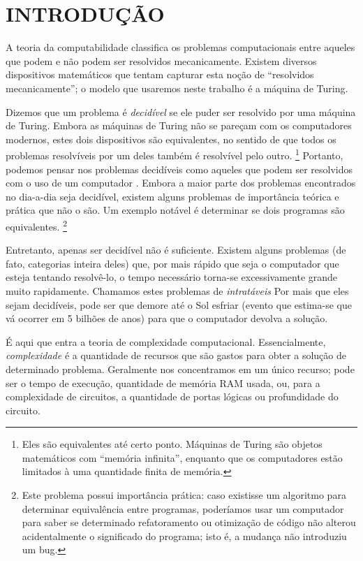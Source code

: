 \chapter{INTRODUÇÃO}

A teoria da computabilidade
classifica os problemas computacionais entre
aqueles que podem e não podem ser resolvidos mecanicamente.
Existem diversos dispositivos matemáticos
que tentam capturar esta noção de
``resolvidos mecanicamente'';
o modelo que usaremos neste trabalho é a máquina de Turing.

Dizemos que um problema é \emph{decidível}
se ele puder ser resolvido por uma máquina de Turing.
Embora as máquinas de Turing
não se pareçam com os computadores modernos,
estes dois dispositivos são equivalentes,
no sentido de que
todos os problemas resolvíveis por um deles
também é resolvível pelo outro.
\footnote{
    Eles são equivalentes até certo ponto.
    Máquinas de Turing são objetos matemáticos
    com ``memória infinita'',
    enquanto que os computadores estão limitados
    à uma quantidade finita de memória.
}
Portanto, podemos pensar nos problemas decidíveis
como aqueles que podem ser resolvidos com o uso de um computador
\cite[p. 307]{HopcroftMotwaniUllman2001}.
Embora a maior parte dos problemas
encontrados no dia-a-dia seja decidível,
existem alguns problemas de importância teórica e prática
que não o são.
Um exemplo notável é determinar se dois programas são equivalentes.
\footnote{
    Este problema possui importância prática:
    caso existisse um algoritmo para determinar equivalência entre programas,
    poderíamos usar um computador para saber se
    determinado refatoramento ou otimização de código
    não alterou acidentalmente o significado do programa;
    isto é, a mudança não introduziu um bug.
}

Entretanto,
apenas ser decidível não é suficiente.
Existem alguns problemas
(de fato, categorias inteira deles)
que, por mais rápido que seja o computador
que esteja tentando resolvê-lo,
o tempo necessário torna-se excessivamente grande
muito rapidamente.
Chamamos estes problemas de \emph{intratáveis}
\cite[p. 1]{HopcroftMotwaniUllman2001}
Por mais que eles sejam decidíveis,
pode ser que demore até o Sol esfriar
(evento que estima-se que vá ocorrer em 5 bilhões de anos)
para que o computador devolva a solução.

É aqui que entra a teoria de complexidade computacional.
Essencialmente,
\emph{complexidade}
é a quantidade de recursos que são gastos
para obter a solução de determinado problema.
Geralmente nos concentramos em um único recurso;
pode ser o tempo de execução,
quantidade de memória RAM usada,
ou,
para a complexidade de circuitos,
a quantidade de portas lógicas
ou profundidade do circuito.

